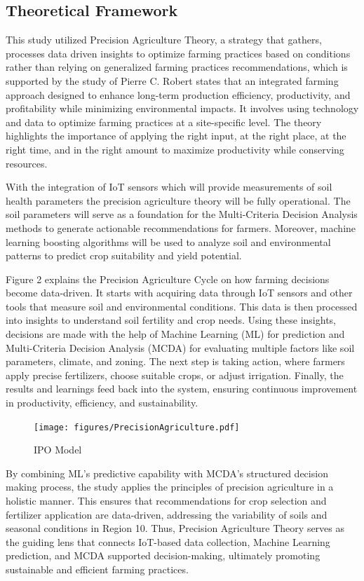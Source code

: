 {\subsection{Theoretical Framework}

This study utilized Precision Agriculture Theory, a strategy that gathers, processes data driven insights to optimize farming practices based on conditions rather than relying on generalized farming practices recommendations, which is supported by the study of Pierre C. Robert states that an integrated farming approach designed to enhance long-term production efficiency, productivity, and profitability while minimizing environmental impacts. It involves using technology and data to optimize farming practices at a site-specific level. The theory highlights the importance of applying the right input, at the right place, at the right time, and in the right amount to maximize productivity while conserving resources. 

With the integration of IoT sensors which will provide measurements of soil health parameters the precision agriculture theory will be fully operational. The soil parameters will serve as a foundation for the Multi-Criteria Decision Analysis methods to generate actionable recommendations for farmers. Moreover, machine learning boosting algorithms will be used to analyze soil and environmental patterns to predict crop suitability and yield potential. 

Figure 2 explains the Precision Agriculture Cycle on how farming decisions become data-driven. It starts with acquiring data through IoT sensors and other tools that measure soil and environmental conditions. This data is then processed into insights to understand soil fertility and crop needs. Using these insights, decisions are made with the help of Machine Learning (ML) for prediction and Multi-Criteria Decision Analysis (MCDA) for evaluating multiple factors like soil parameters, climate, and zoning. The next step is taking action, where farmers apply precise fertilizers, choose suitable crops, or adjust irrigation. Finally, the results and learnings feed back into the system, ensuring continuous improvement in productivity, efficiency, and sustainability.

\begin{figure}[H]
	\centering
	\caption{IPO Model}
	\label{fig:precisionagriculture}
	\texttt{[image: figures/PrecisionAgriculture.pdf]}
\end{figure}

By combining ML’s predictive capability with MCDA’s structured decision making process, the study applies the principles of precision agriculture in a holistic manner. This ensures that recommendations for crop selection and fertilizer application are data-driven, addressing the variability of soils and seasonal conditions in Region 10. Thus, Precision Agriculture Theory serves as the guiding lens that connects IoT-based data collection, Machine Learning prediction, and MCDA supported decision-making, ultimately promoting sustainable and efficient farming practices.

}
